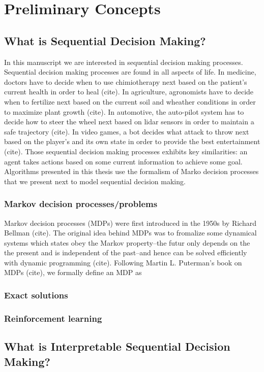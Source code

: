 \chapter*{Preliminary Concepts}

\section{What is Sequential Decision Making?}
In this manuscript we are interested in sequential decision making processes. Sequential decision making processes are found in all aspects of life. In medicine, doctors have to decide when to use chimiotherapy next based on the patient's current health in order to heal (cite). In agriculture, agronomists have to decide when to fertilize next based on the current soil and wheather conditions in order to maximize plant growth (cite). In automotive, the auto-pilot system has to decide how to steer the wheel next based on lidar sensors in order to maintain a safe trajectory (cite). In video games, a bot decides what attack to throw next based on the player's and its own state in order to provide the best entertainment (cite).
Those sequential decision making processes exhibits key similarities: an agent takes actions based on some current information to achieve some goal. 
Algorithms presented in this thesis use the formalism of Marko decision processes that we present next to model sequential decision making.
\subsection{Markov decision processes/problems}
Markov decision processes (MDPs) were first introduced in the 1950s by Richard Bellman (cite). The original idea behind MDPs was to fromalize some dynamical systems which states obey the Markov property--the futur only depends on the the present and is independent of the past--and hence can be solved efficiently with dynamic programming (cite). Following Martin L. Puterman's book on MDPs (cite), we formally define an MDP as  
\subsection{Exact solutions}

\subsection{Reinforcement learning}

\section{What is Interpretable Sequential Decision Making?}

